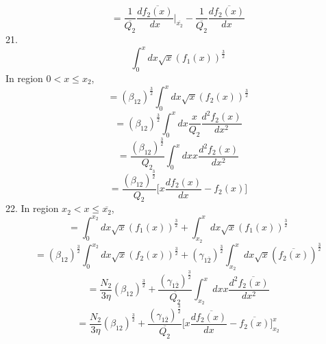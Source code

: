 \documentclass[fleqn, 10pt]{article}
\begin{document}
\begin{equation}
    =  \frac{1}{\overline{Q_{2}}} \frac{d\overline{f_{2}(x)}}{dx}\Bigg|_{\overline{x_{2}}} - \frac{1}{\overline{Q_{2}}} \frac{d\overline{f_{2}(x)}}{dx}
    \label{58}
\end{equation}
    21. 
        \begin{equation*}
            \int^{x}_0 dx \sqrt{x} (f_1(x))^\frac{3}{2}
        \end{equation*}
        In region $0<x \leq x_{2}$, 
        \begin{equation*}
           = (\beta_{12})^\frac{3}{2} \int^{x}_0 dx \sqrt{x} (f_{2}(x))^\frac{3}{2}
        \end{equation*}
        \begin{equation*}
            = (\beta_{12})^\frac{3}{2} \int^{x}_0 dx \frac{x}{Q_{2}} \frac{d^2f_{2}(x)}{dx^2} 
        \end{equation*}
        \begin{equation*}
            = \frac{(\beta_{12})^\frac{3}{2}}{Q_{2}} \int^{x}_0 dx x \frac{d^2f_{2}(x)}{dx^2} 
        \end{equation*}
        \begin{equation}
            = \frac{(\beta_{12})^\frac{3}{2}}{Q_{2}} \biggl[ x\frac{df_{2}(x)}{dx} - f_{2}(x)\biggr]
            \label{106}
        \end{equation}
        22. 
         In region $x_{2}<x\leq \overline{x_{2}}$,  
         \begin{equation*}
             = \int^{x_{2}}_0 dx \sqrt{x} (f_1(x))^\frac{3}{2} + \int^{x}_{x_{2}} dx \sqrt{x} (f_1(x))^\frac{3}{2}
         \end{equation*}
         \begin{equation*}
             = (\beta_{12})^\frac{3}{2} \int^{x_{2}}_0 dx \sqrt{x} (f_{2}(x))^\frac{3}{2} + (\gamma_{1\overline{2}})^\frac{3}{2} \int^{x}_{x_{2}} dx \sqrt{x} (\overline{f_{2}(x)})^\frac{3}{2} 
             \end{equation*}
             \begin{equation*}
                 = \frac{N_{2}}{3 \eta} (\beta_{12})^\frac{3}{2} + \frac{(\gamma_{1\overline{2}})^\frac{3}{2}}{\overline{Q_{2}}} \int^{x}_{x_{2}} dx x \frac{d^2\overline{f_{2}(x)}}{dx^2}
             \end{equation*}
             \begin{equation*}
                 = \frac{N_{2}}{3 \eta} (\beta_{12})^\frac{3}{2} + \frac{(\gamma_{1\overline{2}})^\frac{3}{2}}{\overline{Q_{2}}} \biggl[ x \frac{d\overline{f_{2}(x)}}{dx} - \overline{f_{2}(x)} \biggr]^{x}_{x_{2}} 
                \end{equation*}
\end{document}
